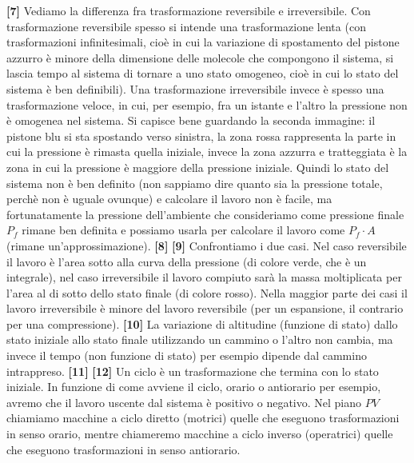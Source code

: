 \newline\textbf{[7]}\; Vediamo la differenza fra trasformazione reversibile e irreversibile. Con trasformazione reversibile spesso si intende una trasformazione lenta (con trasformazioni infinitesimali, cioè in cui la variazione di spostamento del pistone azzurro è minore della dimensione delle molecole che compongono il sistema, si lascia tempo al sistema di tornare a uno stato omogeneo, cioè in cui lo stato del sistema è ben definibili). Una trasformazione irreversibile invece è spesso una trasformazione veloce, in cui, per esempio, fra un istante e l'altro la pressione non è omogenea nel sistema. Si capisce bene guardando la seconda immagine: il pistone blu si sta spostando verso sinistra, la zona rossa rappresenta la parte in cui la pressione è rimasta quella iniziale, invece la zona azzurra e tratteggiata è la zona in cui la pressione è maggiore della pressione iniziale. Quindi lo stato del sistema non è ben definito (non sappiamo dire quanto sia la pressione totale, perchè non è uguale ovunque) e calcolare il lavoro non è facile, ma fortunatamente la pressione dell'ambiente che consideriamo come pressione finale $P_f$ rimane ben definita e possiamo usarla per calcolare il lavoro come $P_f \cdot A$ (rimane un'approssimazione).
\newline\textbf{[8]}\; 
\newline\textbf{[9]}\; Confrontiamo i due casi. Nel caso reversibile il lavoro è l'area sotto alla curva della pressione (di colore verde, che è un integrale), nel caso irreversibile il lavoro compiuto sarà la massa moltiplicata per l'area al di sotto dello stato finale (di colore rosso). Nella maggior parte dei casi il lavoro irreversibile è minore del lavoro reversibile (per un espansione, il contrario per una compressione). 
\newline\textbf{[10]}\; La variazione di altitudine (funzione di stato) dallo stato iniziale allo stato finale utilizzando un cammino o l'altro non cambia, ma invece il tempo (non funzione di stato) per esempio dipende dal cammino intrappreso. 
\newline\textbf{[11]}\; 
\newline\textbf{[12]}\; Un ciclo è un trasformazione che termina con lo stato iniziale. In funzione di come avviene il ciclo, orario o antiorario per esempio, avremo che il lavoro uscente dal sistema è positivo o negativo. Nel piano $PV$ chiamiamo macchine a ciclo diretto (motrici) quelle che eseguono trasformazioni in senso orario, mentre chiameremo macchine a ciclo inverso (operatrici) quelle che eseguono trasformazioni in senso antiorario.
